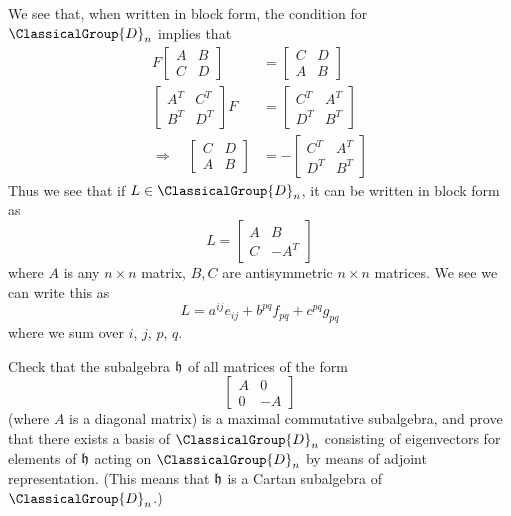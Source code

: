 \answer We see that, when written in block form, the condition
for $\ClassicalGroup{D}_{n}$ implies that
\begin{subequations}
\begin{align}
F\begin{bmatrix}A&B\\C&D
\end{bmatrix}&=\begin{bmatrix}C&D\\A&B\end{bmatrix}\\
\begin{bmatrix}A^{T}&C^{T}\\B^{T}&D^{T}
\end{bmatrix}F&=\begin{bmatrix}C^{T}&A^{T}\\
D^{T}&B^{T}
\end{bmatrix}\\
\Rightarrow\quad\begin{bmatrix}C&D\\A&B\end{bmatrix}&=-\begin{bmatrix}C^{T}&A^{T}\\
D^{T}&B^{T}
\end{bmatrix}
\end{align}
\end{subequations}
Thus we see that if $L\in \ClassicalGroup{D}_{n}$, it can be written in block form
as
\begin{equation}
L=\begin{bmatrix}A&B\\
C&-A^{T}
\end{bmatrix}
\end{equation}
where $A$ is any $n\times n$ matrix, $B,C$ are antisymmetric
$n\times n$ matrices. We see we can write this as
\begin{equation}
L=a^{ij}e_{ij}+b^{pq}f_{pq}+c^{pq}g_{pq}
\end{equation}
where we sum over $i$, $j$, $p$, $q$.

\begin{exercise}
Check that the subalgebra $\frak{h}$ of all matrices of the form
\begin{equation}
\begin{bmatrix}
A&0\\
0&-A
\end{bmatrix}
\end{equation}
(where $A$ is a diagonal matrix) is a maximal commutative
subalgebra, and prove that there exists a basis of $\ClassicalGroup{D}_{n}$
consisting of eigenvectors for elements of $\frak{h}$ acting on
$\ClassicalGroup{D}_{n}$ by means of adjoint representation. (This means that
$\frak{h}$ is a Cartan subalgebra of $\ClassicalGroup{D}_{n}$.)
\end{exercise}

